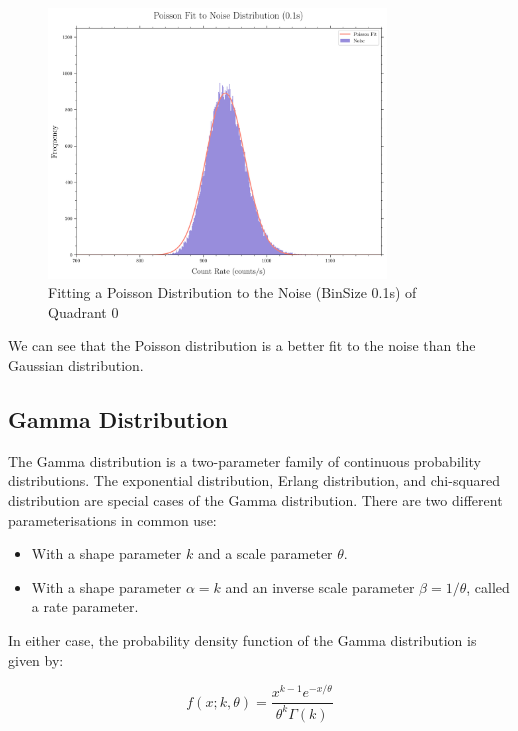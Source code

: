 \documentclass[11pt]{book} %
\begin{document}
\begin{figure}[H]
    \centering
    \includegraphics[width=0.8\textwidth]{Pictures/poisson_fit.png}
    \caption{Fitting a Poisson Distribution to the Noise (BinSize 0.1s) of Quadrant 0}
\end{figure}

We can see that the Poisson distribution is a better fit to the noise than the Gaussian distribution.


\subsection{Gamma Distribution}

The Gamma distribution is a two-parameter family of continuous probability distributions. The exponential distribution, Erlang distribution, and chi-squared distribution are special cases of the Gamma distribution. There are two different parameterisations in common use:

\begin{itemize}
    \item With a shape parameter $k$ and a scale parameter $\theta$.
    \item With a shape parameter $\alpha = k$ and an inverse scale parameter $\beta = 1/\theta$, called a rate parameter.
\end{itemize}

In either case, the probability density function of the Gamma distribution is given by:

\begin{equation} \label{eq:Gamma}
    f(x; k, \theta) = \frac{x^{k-1}e^{-x/\theta}}{\theta^k\Gamma(k)}
\end{equation}
    
\end{document}
